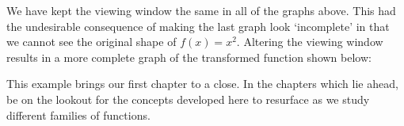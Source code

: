 We have kept the viewing window the same in all of the graphs above.  This had the undesirable consequence of making the last graph look `incomplete' in that we cannot see the original shape of $f(x) = x^{2}$.  Altering the viewing window results in a more complete graph of the transformed function shown below:
\begin{center}
\end{center}

\smallskip

This example brings our first chapter to a close.  In the chapters which lie ahead, be on the lookout for the concepts developed here to resurface as we study different families of functions.  

